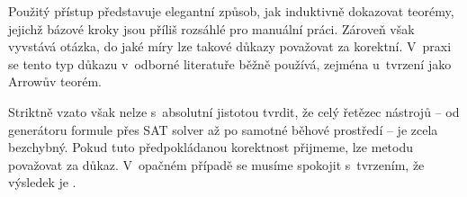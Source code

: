 \documentclass[a4paper, 11pt]{article}
\begin{document}
Použitý přístup představuje elegantní způsob, jak induktivně dokazovat teorémy, jejichž bázové kroky jsou příliš rozsáhlé pro manuální práci.
Zároveň však vyvstává otázka, do jaké míry lze takové důkazy považovat za korektní.
V~praxi se tento typ důkazu v~odborné literatuře běžně používá, zejména u~tvrzení jako Arrowův teorém.

Striktně vzato však nelze s~absolutní jistotou tvrdit, že celý řetězec nástrojů -- od generátoru formule přes SAT solver až po samotné běhové prostředí -- je zcela bezchybný.
Pokud tuto předpokládanou korektnost přijmeme, lze metodu považovat za důkaz.
V~opačném případě se musíme spokojit s~tvrzením, že výsledek je .

\pagebreak

\nocite{*}
\printbibliography
\end{document}
